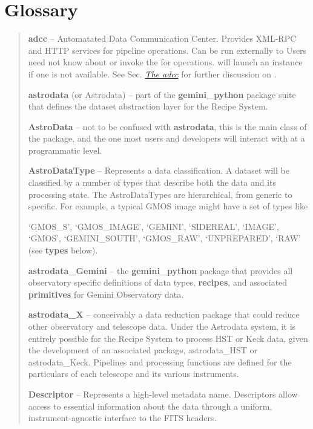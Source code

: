 \documentclass[letterpaper,10pt,english]{sphinxmanual}
\begin{document}
\section{Glossary}
\label{intro:glossary}\begin{quote}

\textbf{adcc} -- Automatated Data Communication Center. Provides XML-RPC and HTTP
services for pipeline operations. Can be run externally to  Users
need not know about or invoke the  for  operations.
 will launch an  instance if one is not available. See
Sec. {\hyperref[discuss:adcc]{\emph{The adcc}}} for further discussion on .

\textbf{astrodata} (or Astrodata) -- part of the \textbf{gemini\_python} package suite
that defines the dataset abstraction layer for the Recipe System.

\textbf{AstroData} -- not to be confused with \textbf{astrodata}, this is the main class
of the  package, and the one most users and developers will
interact with at a programmatic level.

\textbf{AstroDataType} -- Represents a data classification. A dataset will be
classified by a number of types that describe both the data and its processing
state. The AstroDataTypes are hierarchical, from generic to specific.  For
example, a typical GMOS image might have a set of types like

`GMOS\_S', `GMOS\_IMAGE', `GEMINI', `SIDEREAL', `IMAGE', `GMOS', `GEMINI\_SOUTH',
`GMOS\_RAW', `UNPREPARED', `RAW' (see \textbf{types} below).

\textbf{astrodata\_Gemini} -- the \textbf{gemini\_python} package that provides all
observatory specific definitions of data types, \textbf{recipes}, and associated
\textbf{primitives} for Gemini Observatory data.

\textbf{astrodata\_X} -- conceivably a data reduction package that could reduce
other observatory and telescope data. Under the Astrodata system, it is
entirely possible for the Recipe System to process HST or Keck data, given
the development of an associated package, astrodata\_HST or astrodata\_Keck.
Pipelines and processing functions are defined for the particulars of each
telescope and its various instruments.

\textbf{Descriptor} -- Represents a high-level metadata name. Descriptors allow
access to essential information about the data through a uniform,
instrument-agnostic interface to the FITS headers.


\end{quote}
\end{document}
